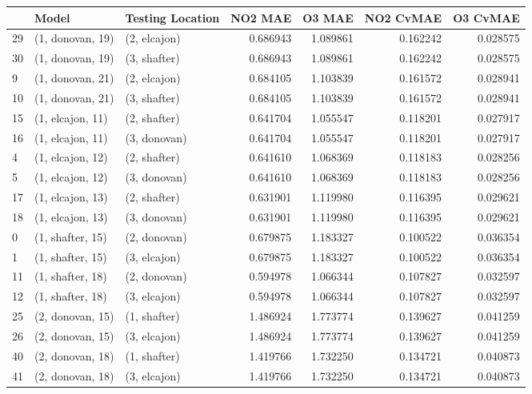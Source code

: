 \begin{tabular}{lllrrrr}
\toprule
{} &             Model & Testing Location &   NO2 MAE &    O3 MAE &  NO2 CvMAE &  O3 CvMAE \\
\midrule
29 &  (1, donovan, 19) &     (2, elcajon) &  0.686943 &  1.089861 &   0.162242 &  0.028575 \\
30 &  (1, donovan, 19) &     (3, shafter) &  0.686943 &  1.089861 &   0.162242 &  0.028575 \\
9  &  (1, donovan, 21) &     (2, elcajon) &  0.684105 &  1.103839 &   0.161572 &  0.028941 \\
10 &  (1, donovan, 21) &     (3, shafter) &  0.684105 &  1.103839 &   0.161572 &  0.028941 \\
15 &  (1, elcajon, 11) &     (2, shafter) &  0.641704 &  1.055547 &   0.118201 &  0.027917 \\
16 &  (1, elcajon, 11) &     (3, donovan) &  0.641704 &  1.055547 &   0.118201 &  0.027917 \\
4  &  (1, elcajon, 12) &     (2, shafter) &  0.641610 &  1.068369 &   0.118183 &  0.028256 \\
5  &  (1, elcajon, 12) &     (3, donovan) &  0.641610 &  1.068369 &   0.118183 &  0.028256 \\
17 &  (1, elcajon, 13) &     (2, shafter) &  0.631901 &  1.119980 &   0.116395 &  0.029621 \\
18 &  (1, elcajon, 13) &     (3, donovan) &  0.631901 &  1.119980 &   0.116395 &  0.029621 \\
0  &  (1, shafter, 15) &     (2, donovan) &  0.679875 &  1.183327 &   0.100522 &  0.036354 \\
1  &  (1, shafter, 15) &     (3, elcajon) &  0.679875 &  1.183327 &   0.100522 &  0.036354 \\
11 &  (1, shafter, 18) &     (2, donovan) &  0.594978 &  1.066344 &   0.107827 &  0.032597 \\
12 &  (1, shafter, 18) &     (3, elcajon) &  0.594978 &  1.066344 &   0.107827 &  0.032597 \\
25 &  (2, donovan, 15) &     (1, shafter) &  1.486924 &  1.773774 &   0.139627 &  0.041259 \\
26 &  (2, donovan, 15) &     (3, elcajon) &  1.486924 &  1.773774 &   0.139627 &  0.041259 \\
40 &  (2, donovan, 18) &     (1, shafter) &  1.419766 &  1.732250 &   0.134721 &  0.040873 \\
41 &  (2, donovan, 18) &     (3, elcajon) &  1.419766 &  1.732250 &   0.134721 &  0.040873 \\

\end{tabular}
